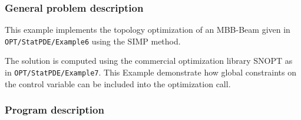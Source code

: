 \subsubsection{General problem description}
This example implements the topology optimization of an MBB-Beam given in \\
{\tt OPT/StatPDE/Example6} using the SIMP method.

The solution is computed using the commercial optimization library SNOPT as in 
{\tt OPT/StatPDE/Example7}. This Example demonstrate how global constraints on
the control variable can be included into the optimization call.

\subsubsection{Program description}

